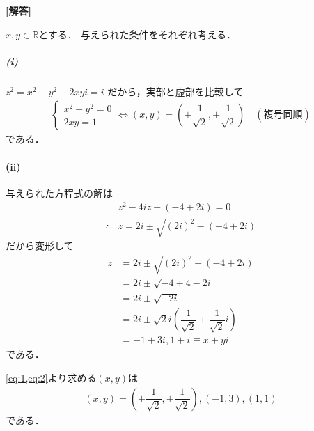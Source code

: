 \documentclass[../../main.tex]{subfiles}
\begin{document}
\begin{oframed}
  
\end{oframed}

{\bf [解答]}

$x, y \in \mathbb{R}$とする．
与えられた条件をそれぞれ考える．

\subparagraph{(i)}

$z^2 = x^2 - y^2 + 2xyi = i$ だから，実部と虚部を比較して
\begin{align}
  \begin{cases}
    x^2 - y^2 = 0 \\
    2xy = 1
  \end{cases}
  \iff
  (x, y) = \left( \pm \dfrac{1}{\sqrt{2}}, \pm \dfrac{1}{\sqrt{2}} \right) \quad (\text{複号同順}) \label{eq:1}
\end{align}
である．

\paragraph{(ii)}

与えられた方程式の解は
\begin{align}
  & z^2 - 4iz + (-4+2i) = 0 \\
  \therefore
  & z = 2i \pm \sqrt{(2i)^2 - (-4+2i)}
\end{align}
だから変形して
\begin{align}
  z &= 2i \pm \sqrt{(2i)^2 - (-4+2i)} \\
  &= 2i \pm \sqrt{-4 + 4 - 2i} \\
  &= 2i \pm \sqrt{-2i} \\
  &= 2i \pm \sqrt{2}i \left( \dfrac{1}{\sqrt{2}} + \dfrac{1}{\sqrt{2}}i \right)\\
  &= -1 + 3i, 1+i \equiv x + yi \label{eq:2}
\end{align}
である．
\casesend

\cref{eq:1,eq:2}より求める$(x,y)$は
\begin{align}
  (x, y) = \left( \pm \dfrac{1}{\sqrt{2}}, \pm \dfrac{1}{\sqrt{2}} \right), (-1, 3), (1,1)
\end{align}
である．

\newpage
\end{document}
